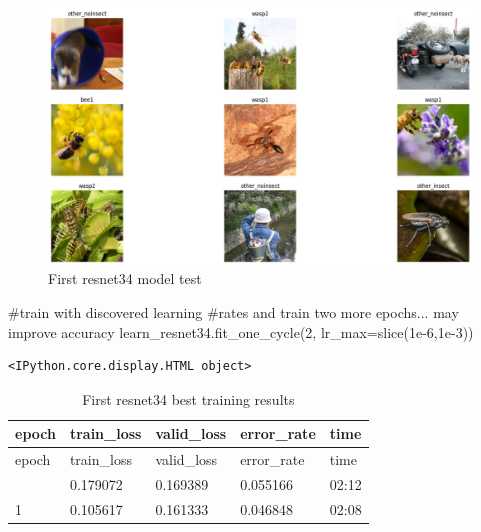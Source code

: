 \documentclass[
  letterpaper,
  DIV=11,
  numbers=noendperiod]{scrartcl}
\newenvironment{Shaded}{\begin{snugshade}}{\end{snugshade}}
\newcommand{\BuiltInTok}[1]{\textcolor[rgb]{0.00,0.23,0.31}{#1}}
\newcommand{\CommentTok}[1]{\textcolor[rgb]{0.37,0.37,0.37}{#1}}
\newcommand{\DecValTok}[1]{\textcolor[rgb]{0.68,0.00,0.00}{#1}}
\newcommand{\FloatTok}[1]{\textcolor[rgb]{0.68,0.00,0.00}{#1}}
\newcommand{\NormalTok}[1]{\textcolor[rgb]{0.00,0.23,0.31}{#1}}
\newcommand{\OperatorTok}[1]{\textcolor[rgb]{0.37,0.37,0.37}{#1}}
\begin{document}
\begin{figure}[H]

{\centering \includegraphics{intro-to-ai-fastai_files/figure-latex/fig-firstresnet34-output-1.png}

}

\caption{\label{fig-firstresnet34}First resnet34 model test}

\end{figure}

\hfill\break

\begin{Shaded}
\begin{Highlighting}[]
\CommentTok{\#train with discovered learning}
\CommentTok{\#rates and train two more epochs... may improve accuracy}
\NormalTok{learn\_resnet34.fit\_one\_cycle(}\DecValTok{2}\NormalTok{, lr\_max}\OperatorTok{=}\BuiltInTok{slice}\NormalTok{(}\FloatTok{1e{-}6}\NormalTok{,}\FloatTok{1e{-}3}\NormalTok{))}
\end{Highlighting}
\end{Shaded}

\begin{verbatim}
<IPython.core.display.HTML object>
\end{verbatim}

\hypertarget{tbl-firstresnet34results}{}
\begin{longtable}[]{@{}lllll@{}}
\caption{\label{tbl-firstresnet34results}First resnet34 best training
results}\tabularnewline
\toprule\noalign{}
epoch & train\_loss & valid\_loss & error\_rate & time \\
\midrule\noalign{}
\endfirsthead
\toprule\noalign{}
epoch & train\_loss & valid\_loss & error\_rate & time \\
\midrule\noalign{}
\endhead
\bottomrule\noalign{}
\endlastfoot
0 & 0.179072 & 0.169389 & 0.055166 & 02:12 \\
1 & 0.105617 & 0.161333 & 0.046848 & 02:08 \\
\end{longtable}
\end{document}
